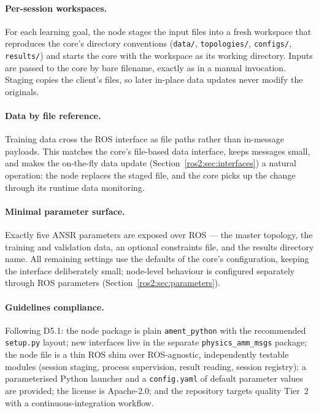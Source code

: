 \paragraph{Per-session workspaces.} For each learning goal, the node stages
the input files into a fresh workspace that reproduces the core's directory
conventions (\texttt{data/}, \texttt{topologies/}, \texttt{configs/},
\texttt{results/}) and starts the core with the workspace as its working
directory. Inputs are passed to the core by bare filename, exactly as in a
manual invocation. Staging copies the client's files, so later in-place data
updates never modify the originals.

\paragraph{Data by file reference.} Training data cross the ROS interface as
file paths rather than in-message payloads. This matches the core's
file-based data interface, keeps messages small, and makes the on-the-fly
data update (Section~\ref{ros2:sec:interfaces}) a natural operation: the node
replaces the staged file, and the core picks up the change through its
runtime data monitoring.

\paragraph{Minimal parameter surface.} Exactly five ANSR parameters are
exposed over ROS --- the master topology, the training and validation data,
an optional constraints file, and the results directory name. All remaining
settings use the defaults of the core's configuration, keeping the interface
deliberately small; node-level behaviour is configured separately through
ROS parameters (Section~\ref{ros2:sec:parameters}).

\paragraph{Guidelines compliance.} Following D5.1: the node package is plain
\texttt{ament\_python} with the recommended \texttt{setup.py} layout; new
interfaces live in the separate \texttt{physics\_amm\_msgs} package; the
node file is a thin ROS shim over ROS-agnostic, independently testable
modules (session staging, process supervision, result reading, session
registry); a parameterised Python launcher and a \texttt{config.yaml} of
default parameter values are provided; the license is Apache-2.0; and the
repository targets quality Tier~2 with a continuous-integration workflow.

